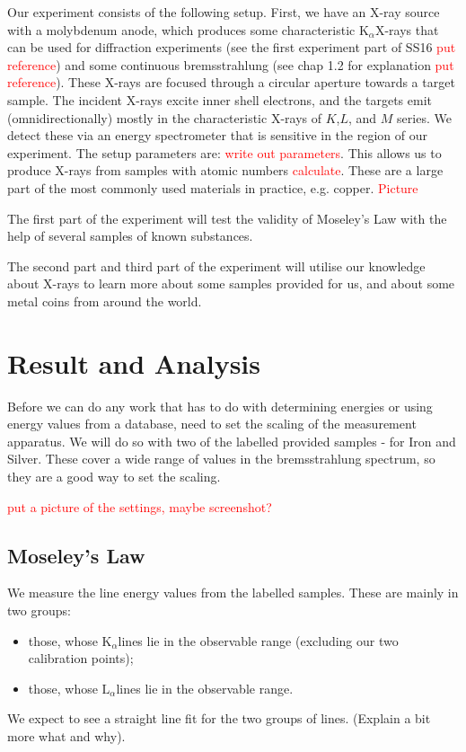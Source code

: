 \documentclass[11pt,a4paper,twoside,onecolumn]{article}
\newcommand{\reminder}[1]{\textcolor{red}{#1}}
\newcommand{\Kalpha}{$\mathrm{K}_\alpha$}
\newcommand{\Lalpha}{$\mathrm{L}_\alpha$}
\begin{document}
Our experiment consists of the following setup. First, we have an X-ray source with a molybdenum anode, which produces some characteristic \Kalpha X-rays that can be used for diffraction experiments (see the first experiment part of SS16 \reminder{put reference}) and some continuous bremsstrahlung (see chap 1.2 for explanation \reminder{put reference}). These X-rays are focused through a circular aperture towards a target sample. The incident X-rays excite inner shell electrons, and the targets emit (omnidirectionally) mostly in the characteristic X-rays of $K$,$L$, and $M$ series. We detect these via an energy spectrometer that is sensitive in the region of our experiment. The setup parameters are:  \reminder{write out parameters}. This allows us to produce X-rays from samples with atomic numbers \reminder{calculate}. These are a large part of the most commonly used materials in practice, e.g. copper. \reminder{Picture}

The first part of the experiment will test the validity of Moseley's Law with the help of several samples of known substances.

The second part and third part of the experiment will utilise our knowledge about X-rays to learn more about some samples provided for us, and about some metal coins from around the world.


\section{Result and Analysis}
Before we can do any work that has to do with determining energies or using energy values from a database, need to set the scaling of the measurement apparatus. We will do so with two of the labelled provided samples - for Iron and Silver. These cover a wide range of values in the bremsstrahlung spectrum, so they are a good way to set the scaling. 

\reminder{put a picture of the settings, maybe screenshot?}

\subsection{Moseley's Law}
We measure the line energy values from the labelled samples. These are mainly in two groups:
\begin{itemize}
    \item those, whose \Kalpha lines lie in the observable range (excluding our two calibration points);
    \item those, whose \Lalpha lines lie in the observable range.
\end{itemize}
We expect to see a straight line fit for the two groups of lines. (Explain a bit more what and why).
\end{document}
